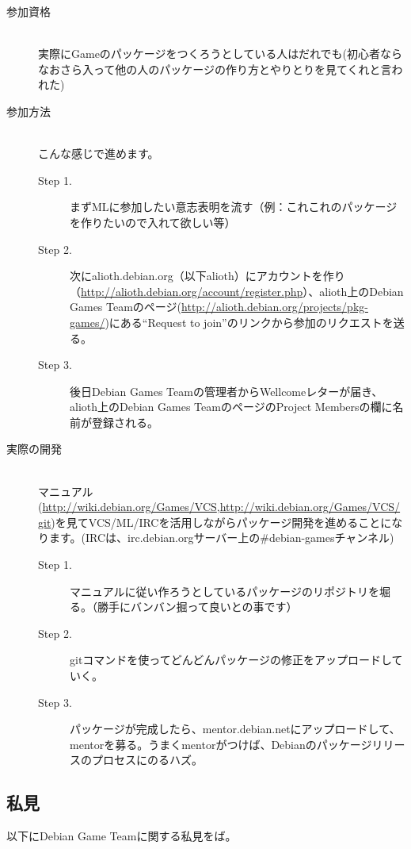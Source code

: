 \documentclass[mingoth,a4paper]{jsarticle}
\begin{document}
 \begin{description}
 \item [参加資格]\mbox{}\\
   実際にGameのパッケージをつくろうとしている人はだれでも(初心者ならなおさら入って他の人のパッケージの作り方とやりとりを見てくれと言われた)
 \item [参加方法]\mbox{}\\
   こんな感じで進めます。
   \begin{description}
   \item [Step 1.]まずMLに参加したい意志表明を流す（例：これこれのパッケージを作りたいので入れて欲しい等）
   \item [Step 2.]次にalioth.debian.org（以下alioth）にアカウントを作り（\url{http://alioth.debian.org/account/register.php}）、alioth上のDebian Games Teamのページ(\url{http://alioth.debian.org/projects/pkg-games/})にある``Request to join''のリンクから参加のリクエストを送る。
 　\item [Step 3.] 後日Debian Games Teamの管理者からWellcomeレターが届き、alioth上のDebian Games TeamのページのProject Membersの欄に名前が登録される。
   \end{description}
 \item [実際の開発]\mbox{}\\
   マニュアル(\url{http://wiki.debian.org/Games/VCS},\url{http://wiki.debian.org/Games/VCS/git})を見てVCS/ML/IRCを活用しながらパッケージ開発を進めることになります。(IRCは、irc.debian.orgサーバー上の\#debian-gamesチャンネル)
   \begin{description}
   \item [Step 1.] マニュアルに従い作ろうとしているパッケージのリポジトリを堀る。（勝手にバンバン掘って良いとの事です）
   \item [Step 2.] gitコマンドを使ってどんどんパッケージの修正をアップロードしていく。
   \item [Step 3.] パッケージが完成したら、mentor.debian.netにアップロードして、mentorを募る。うまくmentorがつけば、Debianのパッケージリリースのプロセスにのるハズ。
   \end{description}
 \end{description}

\subsection{私見}

 以下にDebian Game Teamに関する私見をば。
\end{document}
